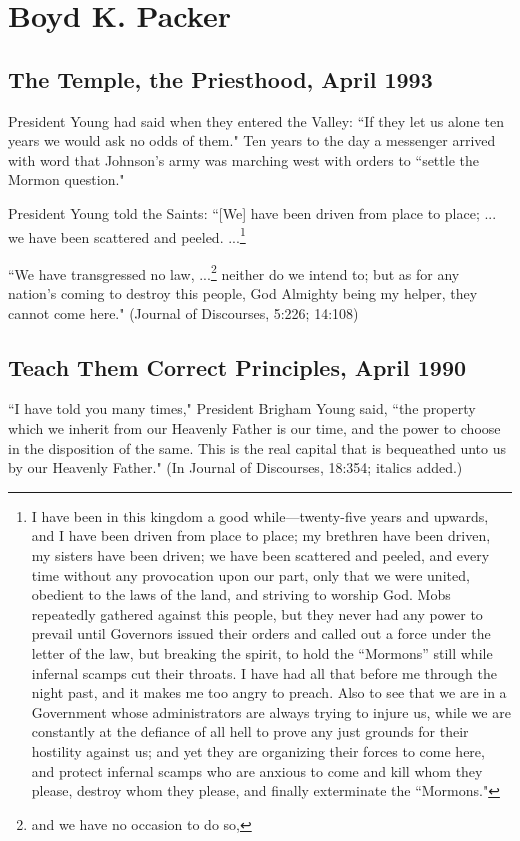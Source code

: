 \section{Boyd K. Packer}

\subsection{The Temple, the Priesthood, April 1993}

President Young had said when they entered the Valley: ``If they let us alone ten years we would ask no odds of them." Ten years to the day a messenger arrived with word that Johnson’s army was marching west with orders to ``settle the Mormon question."

President Young told the Saints: ``[We] have been driven from place to place; ... we have been scattered and peeled. ...\footnote{I have been in this kingdom a good while—twenty-five years and upwards, and I have been driven from place to place; my brethren have been driven, my sisters have been driven; we have been scattered and peeled, and every time without any provocation upon our part, only that we were united, obedient to the laws of the land, and striving to worship God. Mobs repeatedly gathered against this people, but they never had any power to prevail until Governors issued their orders and called out a force under the letter of the law, but breaking the spirit, to hold the “Mormons” still while infernal scamps cut their throats. I have had all that before me through the night past, and it makes me too angry to preach. Also to see that we are in a Government whose administrators are always trying to injure us, while we are constantly at the defiance of all hell to prove any just grounds for their hostility against us; and yet they are organizing their forces to come here, and protect infernal scamps who are anxious to come and kill whom they please, destroy whom they please, and finally exterminate the ``Mormons."}

``We have transgressed no law, ...\footnote{and we have no occasion to do so,} neither do we intend to; but as for any nation’s coming to destroy this people, God Almighty being my helper, they cannot come here." (Journal of Discourses, 5:226; 14:108)

\subsection{Teach Them Correct Principles, April 1990}

``I have told you many times," President Brigham Young said, ``the property which we inherit from our Heavenly Father is our time, and the power to choose in the disposition of the same. This is the real capital that is bequeathed unto us by our Heavenly Father." (In Journal of Discourses, 18:354; italics added.)